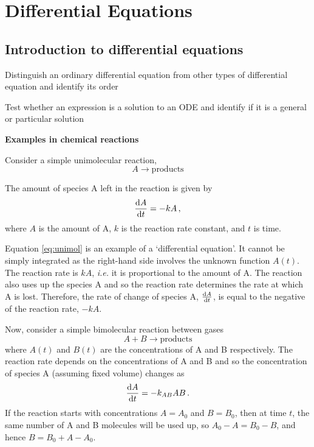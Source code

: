 
\setcounter{section}{5}
\section{Differential Equations}
\begin{ILOssec}
\item \ILOg
\end{ILOssec}


\subsection{Introduction to differential equations}
\label{sec:ode_intro}

\begin{learningoutcomes}
\item Distinguish an ordinary differential equation from other types of differential equation and identify its order
\item Test whether an expression is a solution to an ODE and identify if it is a general or particular solution
\end{learningoutcomes}


\textbf{Examples in chemical reactions}

Consider a simple unimolecular reaction,
\[
A\to \text{products}
\]

The amount of species A left in the reaction is given by
\begin{align}
    \label{eq:unimol} \frac{{\rm d} A}{{\rm d} t}=-kA \, ,
\end{align}
where $A$ is the amount of A, $k$ is the reaction rate constant, and $t$ is time.

Equation \eqref{eq:unimol} is an example of a `differential equation'. It cannot be simply integrated as the right-hand side involves the unknown function $A(t)$. The reaction rate is $kA$, \textit{i.e.} it is proportional to the amount of A. The reaction also uses up the species A and so the reaction rate determines the rate at which A is lost. Therefore, the rate of change of species A, $\frac{{\rm d} A}{{\rm d} t}$, is equal to the negative of the reaction rate, $-kA$.


Now, consider a simple bimolecular reaction between gases
\[
A+B\to \text{products}
\]
where $A(t)$ and $B(t)$ are the concentrations of A and B respectively. The reaction rate depends on the concentrations of A and B and so the concentration of species A (assuming fixed volume) changes as
\[
\frac{{\rm d} A}{{\rm d} t}=-{k}_{AB}AB \, .
\]
If the reaction starts with concentrations $A={A}_{0}$ and $B={B}_{0}$, then at time $t$, the same number of A and B molecules will be used up, so ${A}_{0}-A={B}_{0}-B$, and hence $B={B}_{0}+A-{A}_{0}$.

